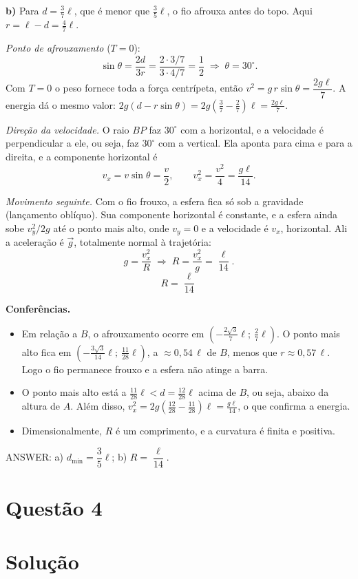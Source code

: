 \documentclass{article}%
\begin{document}
\textbf{b)} Para $d=\tfrac37\ell$, que é menor que $\tfrac35\ell$, o fio afrouxa antes do topo. Aqui $r=\ell-d=\tfrac47\ell$.

\emph{Ponto de afrouxamento} ($T=0$):
\[
\sin\theta=\frac{2d}{3r}=\frac{2\cdot 3/7}{3\cdot 4/7}=\frac12\;\Rightarrow\;\theta=30^\circ .
\]
Com $T=0$ o peso fornece toda a força centrípeta, então $v^2=g\,r\sin\theta=\dfrac{2g\ell}{7}$. A energia dá o mesmo valor: $2g(d-r\sin\theta)=2g\left(\tfrac37-\tfrac27\right)\ell=\tfrac{2g\ell}{7}$.

\emph{Direção da velocidade.} O raio $BP$ faz $30^\circ$ com a horizontal, e a velocidade é perpendicular a ele, ou seja, faz $30^\circ$ com a vertical. Ela aponta para cima e para a direita, e a componente horizontal é
\[
v_x=v\sin\theta=\frac v2,\qquad v_x^2=\frac{v^2}{4}=\frac{g\ell}{14}.
\]

\emph{Movimento seguinte.} Com o fio frouxo, a esfera fica só sob a gravidade (lançamento oblíquo). Sua componente horizontal é constante, e a esfera ainda sobe $v_y^2/2g$ até o ponto mais alto, onde $v_y=0$ e a velocidade é $v_x$, horizontal. Ali a aceleração é $\vec g$, totalmente normal à trajetória:
\[
g=\frac{v_x^2}{R}\;\Longrightarrow\;R=\frac{v_x^2}{g}=\frac{\ell}{14}.
\]
\[
\boxed{R=\dfrac{\ell}{14}}
\]

\textbf{Conferências.}
\begin{itemize}
\item Em relação a $B$, o afrouxamento ocorre em $(-\tfrac{2\sqrt3}{7}\ell;\ \tfrac27\ell)$. O ponto mais alto fica em $(-\tfrac{3\sqrt3}{14}\ell;\ \tfrac{11}{28}\ell)$, a $\approx0{,}54\,\ell$ de $B$, menos que $r\approx0{,}57\,\ell$. Logo o fio permanece frouxo e a esfera não atinge a barra.
\item O ponto mais alto está a $\tfrac{11}{28}\ell<d=\tfrac{12}{28}\ell$ acima de $B$, ou seja, abaixo da altura de $A$. Além disso, $v_x^2=2g\left(\tfrac{12}{28}-\tfrac{11}{28}\right)\ell=\tfrac{g\ell}{14}$, o que confirma a energia.
\item Dimensionalmente, $R$ é um comprimento, e a curvatura é finita e positiva.
\end{itemize}

ANSWER: a) $d_{\min}=\dfrac{3}{5}\ell$; b) $R=\dfrac{\ell}{14}$.%
\newpage%
\section*{Questão 4}

\section*{Solução}
\end{document}
